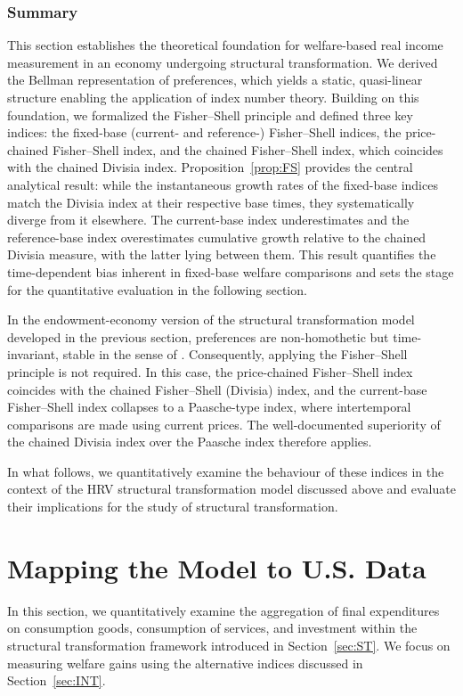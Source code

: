 \documentclass[12pt,a4paper]{article}
\begin{document}
\subsubsection{Summary}
This section establishes the theoretical foundation for welfare-based real income measurement in an economy undergoing structural transformation. We derived the Bellman representation of preferences, which yields a static, quasi-linear structure enabling the application of index number theory. Building on this foundation, we formalized the Fisher–Shell principle and defined three key indices: the fixed-base (current- and reference-) Fisher–Shell indices, the price-chained Fisher–Shell index, and the chained Fisher–Shell index, which coincides with the chained Divisia index. Proposition~\ref{prop:FS} provides the central analytical result: while the instantaneous growth rates of the fixed-base indices match the Divisia index at their respective base times, they systematically diverge from it elsewhere. The current-base index underestimates and the reference-base index overestimates cumulative growth relative to the chained Divisia measure, with the latter lying between them. This result quantifies the time-dependent bias inherent in fixed-base welfare comparisons and sets the stage for the quantitative evaluation in the following section.

In the endowment-economy version of the structural transformation model developed in the previous section, preferences are non-homothetic but time-invariant, stable in the sense of \cite{BB2023welfare}. Consequently, applying the Fisher–Shell principle is not required. In this case, the price-chained Fisher–Shell index coincides with the chained Fisher–Shell (Divisia) index, and the current-base Fisher–Shell index collapses to a Paasche-type index, where intertemporal comparisons are made using current prices. The well-documented superiority of the chained Divisia index over the Paasche index therefore applies.

In what follows, we quantitatively examine the behaviour of these indices in the context of the HRV structural transformation model discussed above and evaluate their implications for the study of structural transformation.

\section{Mapping the Model to U.S. Data}
\label{sec:4}

In this section, we quantitatively examine the aggregation of final expenditures on consumption goods, consumption of services, and investment within the structural transformation framework introduced in Section~\ref{sec:ST}. We focus on measuring welfare gains using the alternative indices discussed in Section~\ref{sec:INT}.
\end{document}
